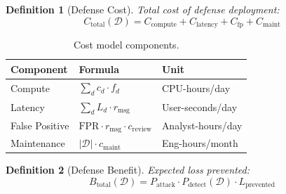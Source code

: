 \documentclass[
]{article}
\newtheorem{definition}{Definition}[section]
\begin{document}
\begin{definition}[Defense Cost]
\label{def:defense-cost}
Total cost of defense deployment:
\begin{equation}
\label{eq:defense-cost}
C_{\text{total}}(\mathcal{D}) = C_{\text{compute}} + C_{\text{latency}} + C_{\text{fp}} + C_{\text{maint}}
\end{equation}
\end{definition}

\begin{table}[htbp]
\centering
\caption{Cost model components.}
\label{tab:cost-components}
\begin{tabular}{@{}llp{4cm}@{}}
\toprule
Component & Formula & Unit \\
\midrule
Compute & $\sum_d c_d \cdot f_d$ & CPU-hours/day \\
Latency & $\sum_d L_d \cdot r_{\text{msg}}$ & User-seconds/day \\
False Positive & $\text{FPR} \cdot r_{\text{msg}} \cdot c_{\text{review}}$ & Analyst-hours/day \\
Maintenance & $|\mathcal{D}| \cdot c_{\text{maint}}$ & Eng-hours/month \\
\bottomrule
\end{tabular}
\end{table}

\begin{definition}[Defense Benefit]
\label{def:defense-benefit}
Expected loss prevented:
\begin{equation}
\label{eq:defense-benefit}
B_{\text{total}}(\mathcal{D}) = P_{\text{attack}} \cdot P_{\text{detect}}(\mathcal{D}) \cdot L_{\text{prevented}}
\end{equation}
\end{definition}
\end{document}
